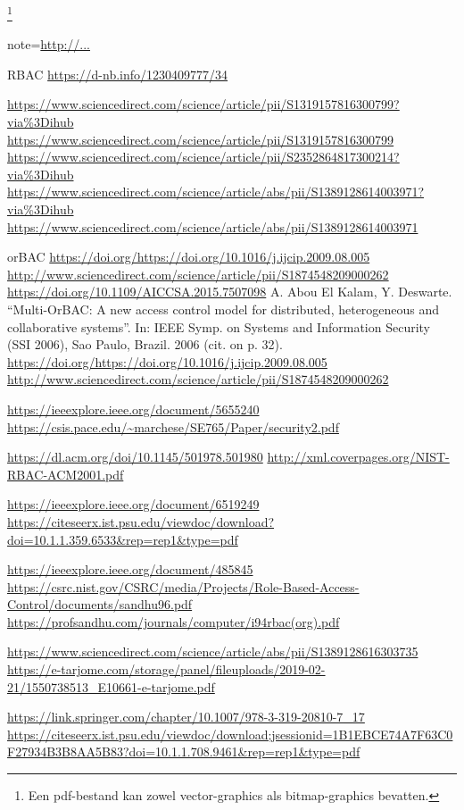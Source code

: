 \footnote{Een pdf-bestand kan zowel vector-graphics als
	bitmap-graphics bevatten.}



note={\url{http://...}}



RBAC
\url{https://d-nb.info/1230409777/34}


\url{https://www.sciencedirect.com/science/article/pii/S1319157816300799?via%3Dihub}
\url{https://www.sciencedirect.com/science/article/pii/S1319157816300799}
\url{https://www.sciencedirect.com/science/article/pii/S2352864817300214?via%3Dihub}
\url{https://www.sciencedirect.com/science/article/abs/pii/S1389128614003971?via%3Dihub}
\url{https://www.sciencedirect.com/science/article/abs/pii/S1389128614003971}

orBAC
\url{https://doi.org/https://doi.org/10.1016/j.ijcip.2009.08.005}
\url{http://www.sciencedirect.com/science/article/pii/S1874548209000262}
\url{https://doi.org/10.1109/AICCSA.2015.7507098}
A. Abou El Kalam, Y. Deswarte. “Multi-OrBAC: A new access control model for
distributed, heterogeneous and collaborative systems”. In: IEEE Symp. on Systems
and Information Security (SSI 2006), Sao Paulo, Brazil. 2006 (cit. on p. 32).
\url{https://doi.org/https://doi.org/10.1016/j.ijcip.2009.08.005}
\url{http://www.sciencedirect.com/science/article/pii/S1874548209000262}

\url{https://ieeexplore.ieee.org/document/5655240}
\url{https://csis.pace.edu/~marchese/SE765/Paper/security2.pdf}

\url{https://dl.acm.org/doi/10.1145/501978.501980}
\url{http://xml.coverpages.org/NIST-RBAC-ACM2001.pdf}

\url{https://ieeexplore.ieee.org/document/6519249}
\url{https://citeseerx.ist.psu.edu/viewdoc/download?doi=10.1.1.359.6533&rep=rep1&type=pdf}

\url{https://ieeexplore.ieee.org/document/485845}
\url{https://csrc.nist.gov/CSRC/media/Projects/Role-Based-Access-Control/documents/sandhu96.pdf}
\url{https://profsandhu.com/journals/computer/i94rbac(org).pdf}

\url{https://www.sciencedirect.com/science/article/abs/pii/S1389128616303735}
\url{https://e-tarjome.com/storage/panel/fileuploads/2019-02-21/1550738513_E10661-e-tarjome.pdf}

\url{https://link.springer.com/chapter/10.1007/978-3-319-20810-7_17}
\url{https://citeseerx.ist.psu.edu/viewdoc/download;jsessionid=1B1EBCE74A7F63C0F27934B3B8AA5B83?doi=10.1.1.708.9461&rep=rep1&type=pdf}

